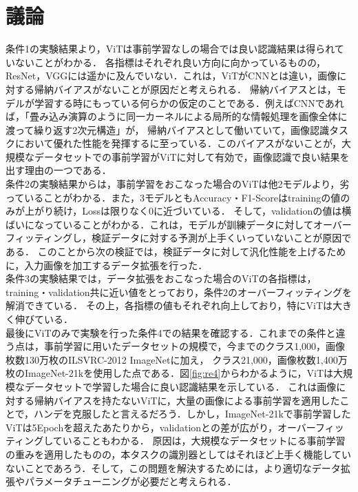\documentclass[a4paper, oneside, openany, dvipdfmx]{suribt}%
\newcommand{\fref}[1]{図\ref{#1}}
\begin{document}
\chapter{議論}
条件1の実験結果より，ViTは事前学習なしの場合では良い認識結果は得られていないことがわかる．
各指標はそれぞれ良い方向に向かっているものの，ResNet，VGGには遥かに及んでいない．これは，ViTがCNNとは違い，画像に対する帰納バイアスがないことが原因だと考えられる．
帰納バイアスとは，モデルが学習する時にもっている何らかの仮定のことである．例えばCNNであれば，「畳み込み演算のように同一カーネルによる局所的な情報処理を画像全体に渡って繰り返す2次元構造」が，
帰納バイアスとして働いていて，画像認識タスクにおいて優れた性能を発揮するに至っている．このバイアスがないことが，大規模なデータセットでの事前学習がViTに対して有効で，画像認識で良い結果を出す理由の一つである．\\
条件2の実験結果からは，事前学習をおこなった場合のViTは他2モデルより，劣っていることがわかる．また，3モデルともAccuracy・F1-Scoreはtrainingの値のみが上がり続け，Lossは限りなく0に近づいている．
そして，validationの値は横ばいになっていることがわかる．これは，モデルが訓練データに対してオーバーフィッティングし，検証データに対する予測が上手くいっていないことが原因である．
このことから次の検証では，検証データに対して汎化性能を上げるために，入力画像を加工するデータ拡張を行った．\\
条件3の実験結果では，データ拡張をおこなった場合のViTの各指標は，training・validation共に近い値をとっており，条件2のオーバーフィッティングを解消できている．
その上，各指標の値もそれぞれ向上しており，特にViTは大きく伸びている．\\
最後にViTのみで実験を行った条件4での結果を確認する．これまでの条件と違う点は，事前学習に用いたデータセットの規模で，今までのクラス1,000，画像枚数130万枚のILSVRC-2012 ImageNetに加え，
クラス21,000，画像枚数1,400万枚のImageNet-21kを使用した点である．\fref{fig:re4}からわかるように，ViTは大規模なデータセットで学習した場合に良い認識結果を示している．
これは画像に対する帰納バイアスを持たないViTに，大量の画像による事前学習を適用したことで，ハンデを克服したと言えるだろう．しかし，ImageNet-21kで事前学習したViTは5Epochを超えたあたりから，validationとの差が広がり，オーバーフィッティングしていることもわかる．
原因は，大規模なデータセットにる事前学習の重みを適用したものの，本タスクの識別器としてはそれほど上手く機能していないことであろう．そして，この問題を解決するためには，より適切なデータ拡張やパラメータチューニングが必要だと考えられる．
\end{document}
